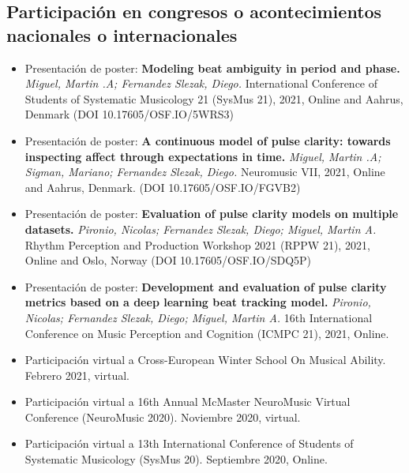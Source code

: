 \documentclass[a4paper,10pt]{article}
\begin{document}
\subsection{Participación en congresos o acontecimientos nacionales o
internacionales}

\begin{itemize}
  \item Presentación de poster: 
      \textbf{Modeling beat ambiguity in period and phase.}
    \emph{Miguel, Martin .A; Fernandez Slezak, Diego.} 
International Conference of Students of Systematic
Musicology 21 (SysMus 21), 2021, Online and Aahrus, Denmark (DOI
  10.17605/OSF.IO/5WRS3)
  
\item Presentación de poster: 
  \textbf{A continuous model of pulse clarity: towards inspecting affect through
  expectations in time.} 
  \emph{Miguel, Martin .A; Sigman, Mariano;  Fernandez Slezak, Diego.} 
  Neuromusic VII, 2021, 
  Online and Aahrus, Denmark. (DOI 10.17605/OSF.IO/FGVB2)

  \item Presentación de poster: 
    \textbf{Evaluation of pulse clarity models on multiple datasets.} 
    \emph{Pironio, Nicolas; Fernandez Slezak, Diego; Miguel, Martin A.} 
Rhythm Perception and Production Workshop 2021 (RPPW 21), 2021, Online and
Oslo, Norway (DOI 10.17605/OSF.IO/SDQ5P)

  \item Presentación de poster: 
  \textbf{Development and evaluation of pulse clarity metrics based on a deep learning
beat tracking model.} 
    \emph{Pironio, Nicolas; Fernandez Slezak, Diego; Miguel, Martin A.} 
  16th International Conference on Music Perception and Cognition (ICMPC 21),
  2021, Online. 

\item Participación virtual a Cross-European Winter School On Musical Ability.
  Febrero 2021, virtual.

\item Participación virtual a 16th Annual McMaster
  NeuroMusic Virtual Conference (NeuroMusic 2020). Noviembre 2020,
  virtual.

\item Participación virtual a 13th International Conference of Students of
  Systematic Musicology (SysMus 20). Septiembre
  2020, Online.


\end{itemize}
\end{document}
